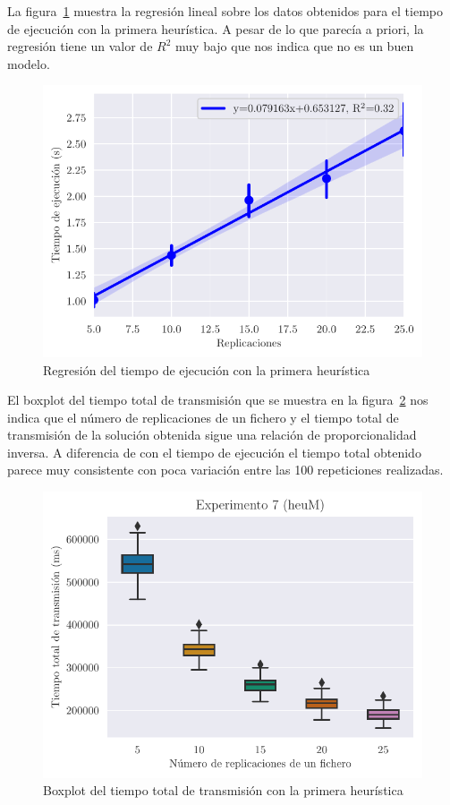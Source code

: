 La figura~\ref{fig:ex7reg} muestra la regresión lineal sobre los datos obtenidos para el tiempo de ejecución con
la primera heurística. A pesar de lo que parecía a priori, la regresión tiene un valor de $R^2$ muy bajo
que nos indica que no es un buen modelo.

\begin{figure}[H]
    \centering
    \includegraphics{include/plots/ex7_time_reg.pdf}
    \caption{Regresión del tiempo de ejecución con la primera heurística}%
    \label{fig:ex7reg}
\end{figure}

El boxplot del tiempo total de transmisión que se muestra en la figura~\ref{fig:ex7ttt} nos indica
que el número de replicaciones de un fichero y el tiempo total de transmisión de la solución obtenida
sigue una relación de proporcionalidad inversa. A diferencia de con el tiempo de ejecución el tiempo total
obtenido parece muy consistente con poca variación entre las 100 repeticiones realizadas.

\begin{figure}[H]
    \centering
    \includegraphics{include/plots/ex7_ttt_bplot.pdf}
    \caption{Boxplot del tiempo total de transmisión con la primera heurística}%
    \label{fig:ex7ttt}
\end{figure}

